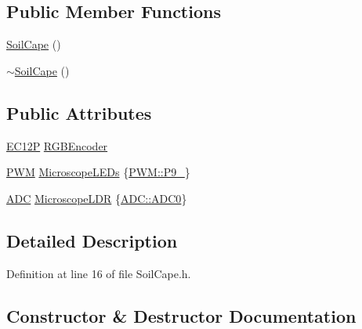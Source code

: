 \subsection*{Public Member Functions}
\begin{DoxyCompactItemize}
\item 
\hyperlink{class_hardware_1_1_soil_cape_acbe71c2b3132c35e3aa9fb619e193a10}{Soil\+Cape} ()
\item 
\hyperlink{class_hardware_1_1_soil_cape_acde8b92055d91a85b016623c7ccd5f5c}{$\sim$\+Soil\+Cape} ()
\end{DoxyCompactItemize}
\subsection*{Public Attributes}
\begin{DoxyCompactItemize}
\item 
\hyperlink{class_hardware_1_1_e_c12_p}{E\+C12\+P} \hyperlink{class_hardware_1_1_soil_cape_a0e68dc6f30fdcbff0462d2996e47a338}{R\+G\+B\+Encoder}
\item 
\hyperlink{class_hardware_1_1_p_w_m}{P\+W\+M} \hyperlink{class_hardware_1_1_soil_cape_a80d499485dddb861cddaffa439b655dd}{Microscope\+L\+E\+Ds} \{\hyperlink{class_hardware_1_1_p_w_m_a7cc6acf1c28f0eaef16246635dc0353aa68cc50c029ae66d2fa7014839e40f771}{P\+W\+M\+::\+P9\+\_}\}
\item 
\hyperlink{class_hardware_1_1_a_d_c}{A\+D\+C} \hyperlink{class_hardware_1_1_soil_cape_a7a6d0bcfcba2d65f4c19ab41cbaace46}{Microscope\+L\+D\+R} \{\hyperlink{class_hardware_1_1_a_d_c_adb1507998c096cbdf7031527f6a690cfaaad3628f17c4d36b8d16123e7017ad63}{A\+D\+C\+::\+A\+D\+C0}\}
\end{DoxyCompactItemize}


\subsection{Detailed Description}


Definition at line 16 of file Soil\+Cape.\+h.



\subsection{Constructor \& Destructor Documentation}
\hypertarget{class_hardware_1_1_soil_cape_acbe71c2b3132c35e3aa9fb619e193a10}{}
